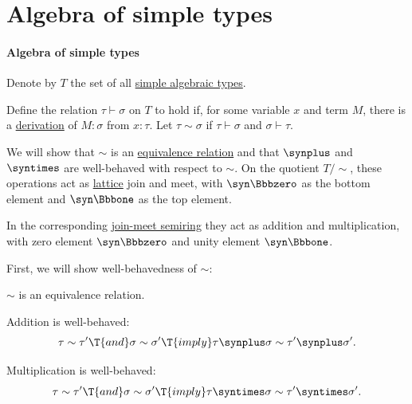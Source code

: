 \section{Algebra of simple types}\label{sec:algebra_of_simple_types}

\paragraph{Algebra of simple types}

\begin{proposition}\label{thm:simple_algebraic_type_arithmetic}
  Denote by \( T \) the set of all \hyperref[def:simple_algebraic_types]{simple algebraic types}. 

  Define the relation \( \tau \vdash \sigma \) on \( T \) to hold if, for some variable \( x \) and term \( M \), there is a \hyperref[def:type_derivation_tree]{derivation} of \( M: \sigma \) from \( x: \tau \). Let \( \tau \sim \sigma \) if \( \tau \vdash \sigma \) and \( \sigma \vdash \tau \).

  We will show that \( {\sim} \) is an \hyperref[def:equivalence_relation]{equivalence relation} and that \( {\synplus} \) and \( {\syntimes} \) are well-behaved with respect to \( {\sim} \). On the quotient \( T / {\sim} \), these operations act as \hyperref[def:lattice]{lattice} join and meet, with \( {\syn\Bbbzero} \) as the bottom element and \( {\syn\Bbbone} \) as the top element.

  In the corresponding \hyperref[def:lattice_as_semiring]{join-meet semiring} they act as addition and multiplication, with zero element \( {\syn\Bbbzero} \) and unity element \( {\syn\Bbbone} \).

  First, we will show well-behavedness of \( {\sim} \):
  \begin{thmenum}[series=thm:simple_algebraic_type_arithmetic]
     \( {\sim} \) is an equivalence relation.

     Addition is well-behaved:
    \begin{equation}\label{eq:thm:simple_algebraic_type_arithmetic/addition_well_behaved}
      \tau \sim \tau' \T{and} \sigma \sim \sigma' \T{imply} \tau \synplus \sigma \sim \tau' \synplus \sigma'.
    \end{equation}

     Multiplication is well-behaved:
    \begin{equation}\label{eq:thm:simple_algebraic_type_arithmetic/multiplication_well_behaved}
      \tau \sim \tau' \T{and} \sigma \sim \sigma' \T{imply} \tau \syntimes \sigma \sim \tau' \syntimes \sigma'.
    \end{equation}
  \end{thmenum}


\end{proposition}
